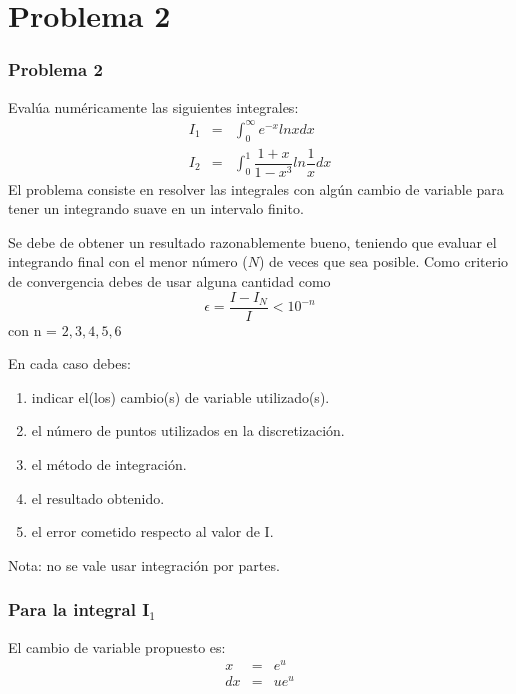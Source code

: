\section{Problema 2}
\begin{frame}
\frametitle{Problema 2}
Eval\'{u}a num\'{e}ricamente las siguientes integrales:
	\begin{eqnarray*}
		I_{1} &=& \int_{0}^{\infty} e^{-x} ln x dx \\
		I_{2} &=& \int_{0}^{1} \dfrac{1+x}{1-x^{3}} ln\dfrac{1}{x} dx
	\end{eqnarray*}
	El problema consiste en resolver las integrales con alg\'{u}n cambio de variable para tener un integrando suave en un intervalo finito.
\end{frame}
\begin{frame}
	Se debe de obtener un resultado razonablemente bueno, teniendo que evaluar el integrando final con el menor n\'{u}mero ($N$) de veces que sea posible. Como criterio de convergencia debes de usar alguna cantidad como
	\[ \epsilon = \dfrac{I - I_{N}}{I} < 10^{-n}\]
	con n = $2,3,4,5,6$
\end{frame}
\begin{frame}
En cada caso debes:
\begin{enumerate}
	\item indicar el(los) cambio(s) de variable utilizado(s).
	\item el n\'{u}mero de puntos utilizados en la discretizaci\'{o}n.
	\item el m\'{e}todo de integraci\'{o}n.
	\item el resultado obtenido.
	\item el error cometido respecto al valor de I.
\end{enumerate}
Nota: no se vale usar integraci\'{o}n por partes.
\end{frame}
\begin{frame}
\frametitle{Para la integral I$_{1}$}
El cambio de variable propuesto es:
\begin{eqnarray*}
x &=& e^{u} \\
dx &=& u e^{u}
\end{eqnarray*}
\end{frame}
